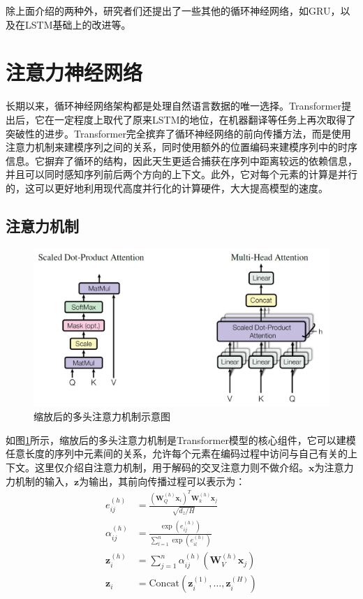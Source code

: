 除上面介绍的两种外，研究者们还提出了一些其他的循环神经网络，如GRU\cite{cho-etal-2014-properties}，以及在LSTM基础上的改进等。

\section{注意力神经网络}

长期以来，循环神经网络架构都是处理自然语言数据的唯一选择。Transformer\cite{attn17}提出后，它在一定程度上取代了原来LSTM的地位，在机器翻译等任务上再次取得了突破性的进步。Transformer完全摈弃了循环神经网络的前向传播方法，而是使用注意力机制来建模序列之间的关系，同时使用额外的位置编码来建模序列中的时序信息。它摒弃了循环的结构，因此天生更适合捕获在序列中距离较远的依赖信息，并且可以同时感知序列前后两个方向的上下文。此外，它对每个元素的计算是并行的，这可以更好地利用现代高度并行化的计算硬件，大大提高模型的速度。

\subsection{注意力机制}

\begin{figure}[]
    \centering
    \includegraphics[width=\linewidth]{figure/scaled_multiheaded_attn.png}
    \caption{缩放后的多头注意力机制示意图\cite{attn17}}
    \label{attn}
\end{figure}

如图\ref{attn}所示，缩放后的多头注意力机制是Transformer模型的核心组件，它可以建模任意长度的序列中元素间的关系，允许每个元素在编码过程中访问与自己有关的上下文。这里仅介绍自注意力机制，用于解码的交叉注意力则不做介绍。$\bm{x}$为注意力力机制的输入，$\bm{z}$为输出，其前向传播过程可以表示为：
\begin{align}
    e_{ij}^{\left(h\right)}&=\frac{\left(\bm{W}_Q^{\left(h\right)}\bm{x}_i\right)^T\bm{W}_k^{\left(h\right)}\bm{x}_j}{\sqrt{d_z/H}}\\
    \alpha_{ij}^{\left(h\right)}&=\frac{\exp{\left(e_{ij}^{\left(h\right)}\right)}}{\sum_{l=1}^{n}\exp{\left(e_{il}^{\left(h\right)}\right)}}\\
    \bm{z}_i^{\left(h\right)}&=\sum_{j=1}^{n}{\alpha_{ij}^{\left(h\right)}\left(\bm{W}_V^{\left(h\right)}\bm{x}_j\right)}\\
    \bm{z}_i&=\mathrm{Concat}\left(\bm{z}_i^{\left(1\right)},\ldots,\bm{z}_i^{\left(H\right)}\right)
\end{align}

